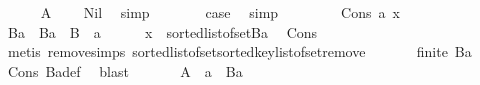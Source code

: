 \begin{isabellebody}
\ \ \ \ \isamarkupfalse%
\ {\isachardoublequoteopen}A\ {\isacharequal}{\kern0pt}\ {\isacharbraceleft}{\kern0pt}{\isacharbraceright}{\kern0pt}{\isachardoublequoteclose}\ \isamarkupfalse%
\ Nil\ \isamarkupfalse%
\ simp\isanewline
\ \ \ \ \isamarkupfalse%
\ \isamarkupfalse%
\ {\isacharquery}{\kern0pt}case\ \isamarkupfalse%
\ simp\isanewline
\ \ \isamarkupfalse%
\isanewline
\ \ \ \ \isamarkupfalse%
\ {\isacharparenleft}{\kern0pt}Cons\ a\ x{\isacharparenright}{\kern0pt}\isanewline
\ \ \ \ \isamarkupfalse%
\ Ba\ \ {\isachardoublequoteopen}Ba\ {\isasymequiv}\ B\ {\isacharminus}{\kern0pt}\ {\isacharbraceleft}{\kern0pt}a{\isacharbraceright}{\kern0pt}{\isachardoublequoteclose}\isanewline
\ \ \ \ \isamarkupfalse%
\ {}{\isacharcolon}{\kern0pt}{\isachardoublequoteopen}x\ {\isacharequal}{\kern0pt}\ sorted{\isacharunderscore}{\kern0pt}list{\isacharunderscore}{\kern0pt}of{\isacharunderscore}{\kern0pt}set{\isacharparenleft}{\kern0pt}Ba{\isacharparenright}{\kern0pt}{\isachardoublequoteclose}\ \isamarkupfalse%
\ Cons{\isacharparenleft}{\kern0pt}{}{\isacharcomma}{\kern0pt}{}{\isacharcomma}{\kern0pt}{}{\isacharparenright}{\kern0pt}\isanewline
\ \ \ \ \ \ \isamarkupfalse%
\ {\isacharparenleft}{\kern0pt}metis\ remove{}{\isachardot}{\kern0pt}simps{\isacharparenleft}{\kern0pt}{}{\isacharparenright}{\kern0pt}\ sorted{\isacharunderscore}{\kern0pt}list{\isacharunderscore}{\kern0pt}of{\isacharunderscore}{\kern0pt}set{\isachardot}{\kern0pt}sorted{\isacharunderscore}{\kern0pt}key{\isacharunderscore}{\kern0pt}list{\isacharunderscore}{\kern0pt}of{\isacharunderscore}{\kern0pt}set{\isacharunderscore}{\kern0pt}remove{\isacharparenright}{\kern0pt}\isanewline
\ \ \ \ \isamarkupfalse%
\ {}{\isacharcolon}{\kern0pt}\ {\isachardoublequoteopen}finite\ Ba{\isachardoublequoteclose}\ \isamarkupfalse%
\ Cons{\isacharparenleft}{\kern0pt}{}{\isacharparenright}{\kern0pt}\ Ba{\isacharunderscore}{\kern0pt}def\ \isamarkupfalse%
\ blast\isanewline
\ \ \ \ \isamarkupfalse%
\ {}{\isacharcolon}{\kern0pt}\ {\isachardoublequoteopen}A\ {\isacharminus}{\kern0pt}\ {\isacharbraceleft}{\kern0pt}a{\isacharbraceright}{\kern0pt}\ {\isasymsubseteq}\ Ba{\isachardoublequoteclose}\ \isamarkupfalse%

\end{isabellebody}
